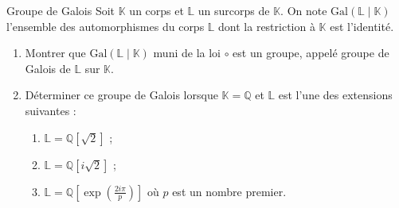 \documentclass[french,a4paper]{article}
\newcommand{\Q}{\mathbb{Q}}
\newcommand{\K}{\mathbb{K}}
\renewcommand{\L}{\mathbb{L}}
\theoremstyle{plain}
\theoremstyle{definition}
\theoremstyle{remark}
\begin{document}
\begin{ex}[Châteaux]{Groupe de Galois}
	Soit $\K$ un corps et $\L$ un surcorps de $\K$. On note $\text{Gal}(\L\mid\K)$ l'ensemble des automorphismes du corps $\L$ dont la restriction à $\K$ est l'identité.
	\begin{enumerate}
		\item Montrer que $\text{Gal}(\L\mid\K)$ muni de la loi $\circ$ est un groupe, appelé groupe de Galois de $\L$ sur $\K$.
		\item Déterminer ce groupe de Galois lorsque $\K=\Q$ et $\L$ est l'une des extensions suivantes : 
		\begin{enumerate}[label=\alph*.]
			\item $\L=\Q[\sqrt{2}]$ ;
			\item $\L=\Q[i\sqrt{2}]$ ;
			\item $\L=\Q\left[\exp\left(\frac{2i\pi}{p}\right)\right]$ où $p$ est un nombre premier.
		\end{enumerate}
	\end{enumerate}
\end{ex}
\end{document}
